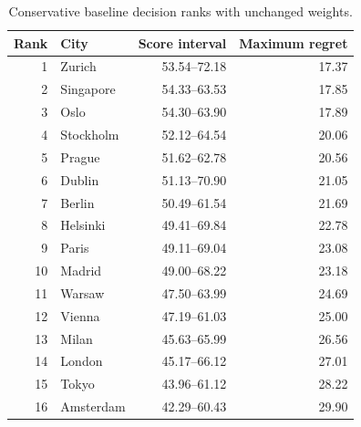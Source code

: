 \begin{table}[htbp]\centering
\caption{Conservative baseline decision ranks with unchanged weights.}\label{tab:baseline}
\begin{tabular}{rlrr}\toprule
Rank & City & Score interval & Maximum regret\\\midrule
1 & Zurich & 53.54--72.18 & 17.37 \\
2 & Singapore & 54.33--63.53 & 17.85 \\
3 & Oslo & 54.30--63.90 & 17.89 \\
4 & Stockholm & 52.12--64.54 & 20.06 \\
5 & Prague & 51.62--62.78 & 20.56 \\
6 & Dublin & 51.13--70.90 & 21.05 \\
7 & Berlin & 50.49--61.54 & 21.69 \\
8 & Helsinki & 49.41--69.84 & 22.78 \\
9 & Paris & 49.11--69.04 & 23.08 \\
10 & Madrid & 49.00--68.22 & 23.18 \\
11 & Warsaw & 47.50--63.99 & 24.69 \\
12 & Vienna & 47.19--61.03 & 25.00 \\
13 & Milan & 45.63--65.99 & 26.56 \\
14 & London & 45.17--66.12 & 27.01 \\
15 & Tokyo & 43.96--61.12 & 28.22 \\
16 & Amsterdam & 42.29--60.43 & 29.90 \\
\bottomrule\end{tabular}\end{table}

